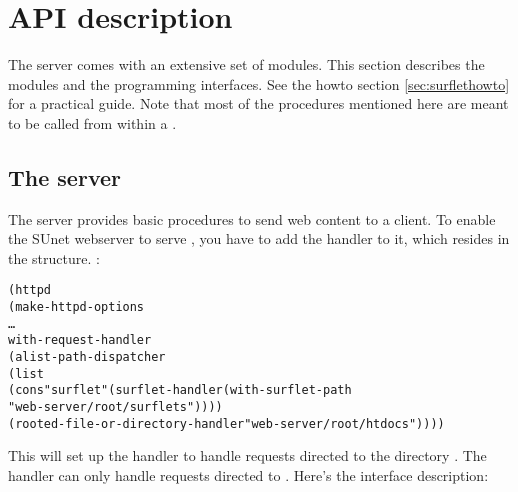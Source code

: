 \section{API description}
\label{sec:surflet-api}

The \surflet server comes with an extensive set of modules.  This
section describes the modules and the programming interfaces.  See the
howto section \ref{sec:surflethowto} for a practical guide.  Note that
most of the procedures mentioned here are meant to be called from
within a \surflet.


\subsection{The \surflet server}

The \surflet server provides basic procedures to send web content to a
client.  To enable the SUnet webserver to serve \surflets, you have to
add the \surflet handler to it, which resides in the
 structure.  \Eg:

\begin{alltt}
(httpd 
  (make-httpd-options
   \dots \\
   with-request-handler 
   (alist-path-dispatcher
    (list
     (cons "surflet" (surflet-handler (with-surflet-path 
                                       "web-server/root/surflets"))))
     (rooted-file-or-directory-handler "web-server/root/htdocs"))))
\end{alltt}

This will set up the \surflet handler to handle requests directed to
the directory .  The \surflet handler can only handle
requests directed to \surflets.  Here's the interface description:

